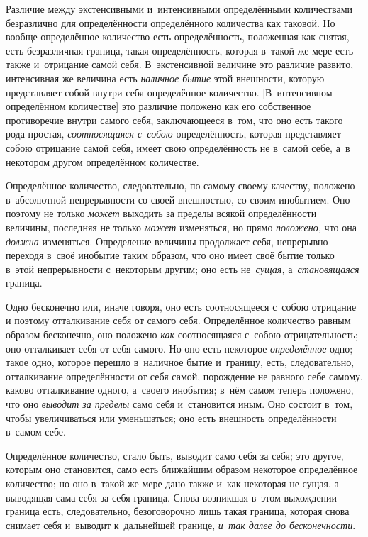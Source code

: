 Различие между экстенсивными и~интенсивными определёнными количествами
безразлично для определённости определённого количества как таковой. Но вообще
определённое количество есть определённость, положенная как снятая, есть
безразличная граница, такая определённость, которая в~такой же мере есть также
и~отрицание самой себя. В~экстенсивной величине это различие развито,
интенсивная же величина есть {\em наличное бытие} этой внешности, которую
представляет собой внутри себя определённое количество. [В~интенсивном
определённом количестве] это различие положено как его собственное противоречие
внутри самого себя, заключающееся в~том, что оно есть такого рода простая,
{\em соотносящаяся с~собою} определённость, которая представляет собою
отрицание самой себя, имеет свою определённость не в~самой себе, а~в некотором другом
определённом количестве.

Определённое количество, следовательно, по самому своему качеству, положено
в~абсолютной непрерывности со своей внешностью, со своим инобытием. Оно поэтому
не только {\em может} выходить за пределы всякой определённости величины,
последняя не только {\em может} изменяться, но прямо {\em положено,} что она
{\em должна} изменяться. Определение величины продолжает себя,
непрерывно переходя в~своё инобытие таким образом, что оно имеет своё бытие
только в~этой непрерывности с~некоторым другим; оно есть не~{\em сущая,}
а~{\em становящаяся} граница.

Одно бесконечно или, иначе говоря, оно есть соотносящееся с~собою отрицание и
поэтому отталкивание себя от самого себя. Определённое количество равным
образом бесконечно, оно положено {\em как} соотносящаяся с~собою отрицательность; оно
отталкивает себя от себя самого. Но оно есть некоторое {\em определённое} одно;
такое одно, которое перешло в~наличное бытие и~границу, есть, следовательно,
отталкивание определённости от себя самой, порождение не равного себе самому,
каково отталкивание одного, а~своего инобытия; в~нём самом теперь положено, что
оно {\em выводит за пределы} само себя и~становится иным. Оно состоит в~том, чтобы
увеличиваться или уменьшаться; оно есть внешность определённости в~самом себе.

Определённое количество, стало быть, выводит само себя за себя; это другое,
которым оно становится, само есть ближайшим образом некоторое определённое
количество; но оно в~такой же мере дано также и~как некоторая не сущая, а
выводящая сама себя за себя граница. Снова возникшая в~этом выхождении граница
есть, следовательно, безоговорочно лишь такая граница, которая снова снимает
себя и~выводит к~дальнейшей границе, {\em и~так далее до бесконечности}.

